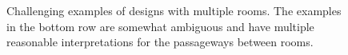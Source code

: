 \begin{figure}[t]
%
\vspace{-0.25in}
\caption{
Challenging examples of designs with multiple rooms.  The
  examples in the bottom row are somewhat ambiguous and have multiple
  reasonable interpretations for the passageways between rooms. 
\vspace{-0.1in}
 }
\label{figure:multiple_rooms}
\end{figure}

